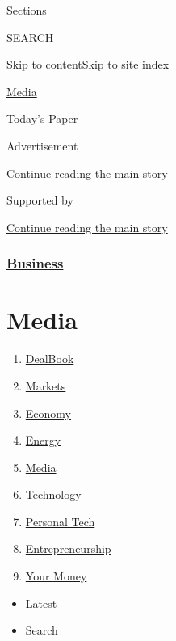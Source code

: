 Sections

SEARCH

\protect\hyperlink{site-content}{Skip to
content}\protect\hyperlink{site-index}{Skip to site index}

\href{https://www.nytimes.com/pages/business/media/index.html}{Media}

\href{https://myaccount.nytimes.com/auth/login?response_type=cookie\&client_id=vi}{}

\href{https://www.nytimes.com/section/todayspaper}{Today's Paper}

Advertisement

\protect\hyperlink{after-top}{Continue reading the main story}

Supported by

\protect\hyperlink{after-sponsor}{Continue reading the main story}

\hypertarget{business}{%
\subsubsection{\texorpdfstring{\href{/section/business}{Business}}{Business}}\label{business}}

\hypertarget{media}{%
\section{Media}\label{media}}

\begin{enumerate}
\def\labelenumi{\arabic{enumi}.}
\tightlist
\item
  \href{/pages/business/dealbook/index.html}{DealBook}
\item
  \href{https://markets.on.nytimes.com}{Markets}
\item
  \href{/section/business/economy}{Economy}
\item
  \href{/section/business/energy-environment}{Energy}
\item
  \href{/section/business/media}{Media}
\item
  \href{/section/technology}{Technology}
\item
  \href{/section/technology/personaltech}{Personal Tech}
\item
  \href{/section/business/smallbusiness}{Entrepreneurship}
\item
  \href{/section/your-money}{Your Money}
\end{enumerate}

\begin{itemize}
\tightlist
\item
  \protect\hyperlink{stream-panel}{Latest}
\item
  Search
\end{itemize}

